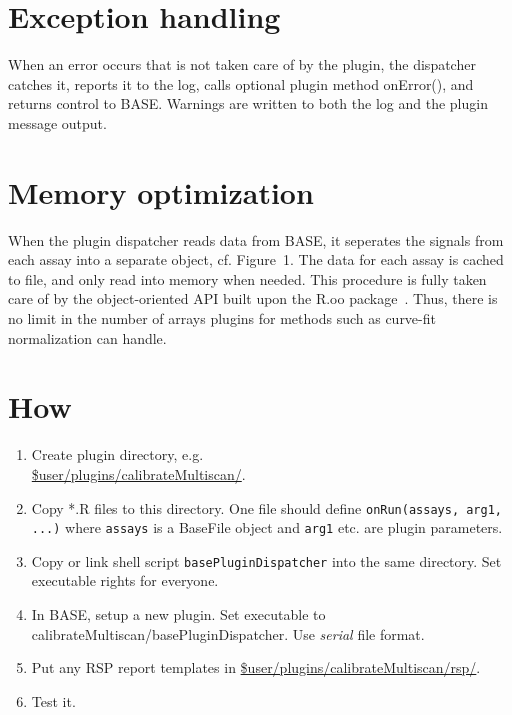 \documentclass[portrait,plainsections]{sciposter}
\begin{document}
\begin{multicols}{3}
\begin{minipage}{\columnwidth}
\section{Exception handling}
When an error occurs that is not taken care of by the plugin, the dispatcher catches it, reports it to the log, calls optional plugin method onError(), and returns control to BASE.  Warnings are written to both the log and the plugin message output.
\end{minipage}


\begin{minipage}{\columnwidth}
\section{Memory optimization}
When the plugin dispatcher reads data from BASE, it seperates the signals from each assay into a separate object, cf. Figure~1.  The data for each assay is cached to file, and only read into memory when needed.  This procedure is fully taken care of by the object-oriented API built upon the R.oo package~\cite{BengtssonH_2003}.  Thus, there is no limit in the number of arrays plugins for methods such as curve-fit normalization can handle.
\end{minipage}


\begin{minipage}{\columnwidth}
\section{How}
\label{secHow}
\begin{enumerate}
 \item Create plugin directory, e.g.\\ \url{$user/plugins/calibrateMultiscan/}.
 \item Copy *.R files to this directory.  One file should define \texttt{onRun(assays, arg1, ...)} where \texttt{assays} is a BaseFile object and \texttt{arg1} etc. are plugin parameters.
 \item Copy or link shell script \texttt{basePluginDispatcher} into the same directory.  Set executable rights for everyone.
 \item In BASE, setup a new plugin.  Set executable to 
       calibrateMultiscan/basePluginDispatcher.  
       Use \emph{serial} file format.
 \item Put any RSP report templates in \url{$user/plugins/calibrateMultiscan/rsp/}.
 \item Test it.
\end{enumerate}


\end{minipage}
\end{multicols}
\end{document}
